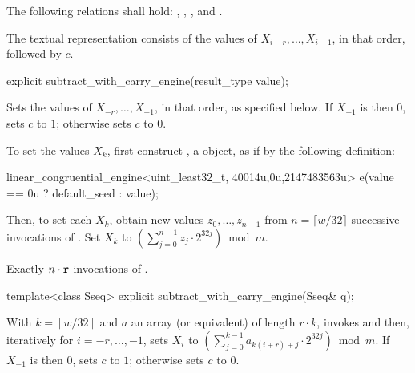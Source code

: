 \pnum
The following relations shall hold:
  ,
  ,
  ,
and
  .

\pnum
The textual representation
consists of the values of
 $X_{i-r}, \dotsc, X_{i-1}$,
in that order, followed by $c$.

%
\begin{itemdecl}
explicit subtract_with_carry_engine(result_type value);
\end{itemdecl}

\begin{itemdescr}
\pnum
\effects
 Sets the values of
 $X_{-r}, \dotsc, X_{-1}$,
 in that order, as specified below.
 If $X_{-1}$ is then $0$,
 sets $c$ to $1$;
 otherwise sets $c$ to $0$.

 To set the values $X_k$,
 first construct , a  object,
 as if by the following definition:
\begin{codeblock}
linear_congruential_engine<uint_least32_t,
                          40014u,0u,2147483563u> e(value == 0u ? default_seed : value);
\end{codeblock}
 Then, to set each $X_k$,
 obtain new values $z_0, \dotsc, z_{n-1}$
 from $n = \lceil w/32 \rceil$ successive invocations
 of .
 Set $X_k$ to $\left( \sum_{j=0}^{n-1} z_j \cdot 2^{32j}\right) \bmod m$.

\pnum
\complexity
Exactly $n \cdot \texttt{\protect r}$ invocations
 of .
\end{itemdescr}

%
\begin{itemdecl}
template<class Sseq> explicit subtract_with_carry_engine(Sseq& q);
\end{itemdecl}

\begin{itemdescr}
\pnum
\effects
 With
 $k = \left\lceil w / 32 \right\rceil$
 and $a$ an array (or equivalent)
 of length $r \cdot k$,
 invokes 
 and then, iteratively for $i = -r, \dotsc, -1$,
 sets $X_i$
 to $ \left(\sum_{j=0}^{k-1}a_{k(i+r)+j} \cdot 2^{32j} \right) \bmod m $.
 If $X_{-1}$ is then $0$,
 sets $c$ to $1$;
 otherwise sets $c$ to $0$.
\end{itemdescr}


